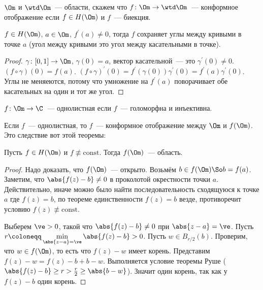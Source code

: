 \begin{definition}
    $\Om$ и $\wtd\Om$~--- области,
    скажем что $f \colon \Om \to \wtd\Om$~--- конформное
    отображение если $f \in H(\Om)$ и $f$~--- биекция.
\end{definition}

\begin{theorem}
    $f\in H(\Om)$, $a \in \Om$, $f^\prime(a) \ne 0$,
    тогда $f$ сохраняет углы между кривыми в точке $a$
    (угол между кривыми это угол между касательными в точке).
\end{theorem}

\begin{proof}
    $\gamma\colon [0, 1] \to \Om$, $\gamma(0) = a$,
    вектор касательной~--- это $\gamma^\prime(0) \ne 0$.
    $(f \circ \gamma )(0) = f(a)$.
    $(f\circ\gamma)^\prime(0) = f^\prime(\gamma(0))\gamma^\prime(0)
        = f^\prime(a)\gamma^\prime(0)$.
    Углы не меняеются, потому что умножение на $f^\prime(a)$
    поворачивает обе касательных на один и тот же угол.
\end{proof}

\begin{definition}
    $f\colon \Om \to \C$~--- однолистная если
    $f$~--- голоморфна и инъективна.
\end{definition}

\begin{observation}
    Если $f$~--- однолистная,
    то $f$~--- конформное отображение между
    $\Om$ и $f(\Om)$.
    Это следствие вот этой теоремы:
\end{observation}

\begin{theorem}
    Пусть $f \in H(\Om)$ и $f \not\equiv \mathrm{const}$.
    Тогда $f(\Om)$~--- область.
\end{theorem}

\begin{proof}
    Надо доказать, что $f(\Om)$~--- открыто.
    Возьмём $b \in f(\Om) \So b = f(a)$.
    Заметим, что $\abs{f(z) - b} \ne 0$ в проколотой окрестности
    точки $a$. Действительно, иначе можно было найти
    последовательность сходящуюся к точке $a$
    где $f(z) = b$, по теореме единственности $f(z) = b$
    везде, противоречит условию $f(z) \not\equiv \mathrm{const}$.

    Выберем $\ve > 0$, такой что $\abs{f(z) - b} \ne 0$
    при $\abs{z-a}=\ve$. Пусть $r \coloneqq \min\limits_{\abs{z-a}=\ve}
        \abs{f(z) - b} > 0$. Пусть $w \in B_{r/2} (b)$.
    Проверим, что $w \in f(\Om)$, то есть что
    $f(z) - w$ имеет корень. Представим
    $f(z) - w = f(z) - b + b - w$.
    Выполняется условие теоремы Руше ($\abs{f(z) - b} \ge
        r > \frac{r}{2} \ge \abs{b-w}$).
    Значит один корень, так как у $f(z) - b$ один корень.
\end{proof}

